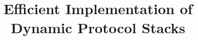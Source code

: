 \documentclass{sig-alternate}
\newcommand{\wolfgang}[1]{\textcolor{blue}{\emph{WM: #1}}}
\begin{document}
%

\title{Efficient Implementation of Dynamic Protocol Stacks}

%
%
%
%
%
\end{document}
